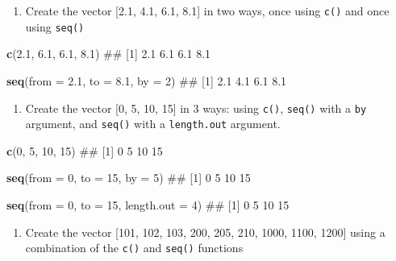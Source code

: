 \documentclass[]{book}
\newenvironment{Shaded}{\begin{snugshade}}{\end{snugshade}}
\newcommand{\KeywordTok}[1]{\textcolor[rgb]{0.13,0.29,0.53}{\textbf{{#1}}}}
\newcommand{\DataTypeTok}[1]{\textcolor[rgb]{0.13,0.29,0.53}{{#1}}}
\newcommand{\DecValTok}[1]{\textcolor[rgb]{0.00,0.00,0.81}{{#1}}}
\newcommand{\FloatTok}[1]{\textcolor[rgb]{0.00,0.00,0.81}{{#1}}}
\newcommand{\NormalTok}[1]{{#1}}
\providecommand{\tightlist}{%
  \setlength{\itemsep}{0pt}\setlength{\parskip}{0pt}}
\theoremstyle{definition}
\theoremstyle{definition}
\theoremstyle{remark}
\begin{document}
\begin{enumerate}
\def\labelenumi{\arabic{enumi}.}
\setcounter{enumi}{1}
\tightlist
\item
  Create the vector {[}2.1, 4.1, 6.1, 8.1{]} in two ways, once using
  \texttt{c()} and once using \texttt{seq()}
\end{enumerate}

\begin{Shaded}
\begin{Highlighting}[]

\KeywordTok{c}\NormalTok{(}\FloatTok{2.1}\NormalTok{, }\FloatTok{6.1}\NormalTok{, }\FloatTok{6.1}\NormalTok{, }\FloatTok{8.1}\NormalTok{)}
\NormalTok{## [1] 2.1 6.1 6.1 8.1}

\KeywordTok{seq}\NormalTok{(}\DataTypeTok{from =} \FloatTok{2.1}\NormalTok{, }\DataTypeTok{to =} \FloatTok{8.1}\NormalTok{, }\DataTypeTok{by =} \DecValTok{2}\NormalTok{)}
\NormalTok{## [1] 2.1 4.1 6.1 8.1}
\end{Highlighting}
\end{Shaded}

\begin{enumerate}
\def\labelenumi{\arabic{enumi}.}
\setcounter{enumi}{2}
\tightlist
\item
  Create the vector {[}0, 5, 10, 15{]} in 3 ways: using \texttt{c()},
  \texttt{seq()} with a \texttt{by} argument, and \texttt{seq()} with a
  \texttt{length.out} argument.
\end{enumerate}

\begin{Shaded}
\begin{Highlighting}[]
\KeywordTok{c}\NormalTok{(}\DecValTok{0}\NormalTok{, }\DecValTok{5}\NormalTok{, }\DecValTok{10}\NormalTok{, }\DecValTok{15}\NormalTok{)}
\NormalTok{## [1]  0  5 10 15}

\KeywordTok{seq}\NormalTok{(}\DataTypeTok{from =} \DecValTok{0}\NormalTok{, }\DataTypeTok{to =} \DecValTok{15}\NormalTok{, }\DataTypeTok{by =} \DecValTok{5}\NormalTok{)}
\NormalTok{## [1]  0  5 10 15}

\KeywordTok{seq}\NormalTok{(}\DataTypeTok{from =} \DecValTok{0}\NormalTok{, }\DataTypeTok{to =} \DecValTok{15}\NormalTok{, }\DataTypeTok{length.out =} \DecValTok{4}\NormalTok{)}
\NormalTok{## [1]  0  5 10 15}
\end{Highlighting}
\end{Shaded}

\begin{enumerate}
\def\labelenumi{\arabic{enumi}.}
\setcounter{enumi}{3}
\tightlist
\item
  Create the vector {[}101, 102, 103, 200, 205, 210, 1000, 1100, 1200{]}
  using a combination of the \texttt{c()} and \texttt{seq()} functions
\end{enumerate}
\end{document}
